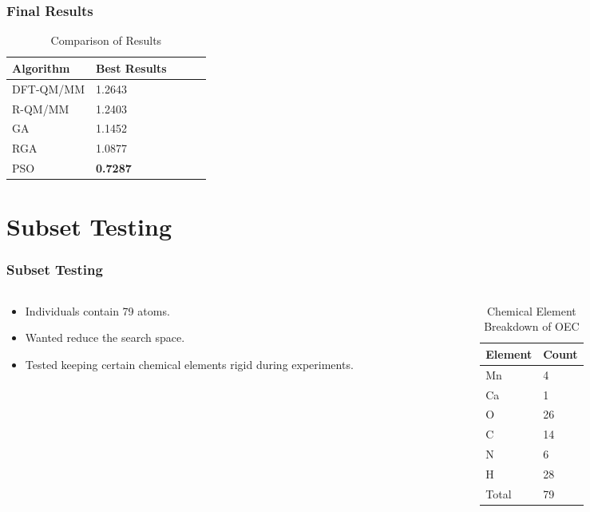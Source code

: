 \documentclass[10pt]{beamer}
\begin{document}
\begin{frame}
	\frametitle{Final Results}

	\begin{table}
		\caption{Comparison of Results}
		\begin{tabular}{ | l | l | l | l | l | }
		  \hline
		    Algorithm & Best Results \\ \hline
		    DFT-QM/MM & 1.2643 \\ \hline
		    R-QM/MM & 1.2403 \\ \hline
		    GA & 1.1452 \\ \hline
		    RGA & 1.0877 \\ \hline
		    PSO & \textbf{0.7287} \\ \hline
		\end{tabular}
	\end{table}

\end{frame}

\section{Subset Testing}

\begin{frame}
	\frametitle{Subset Testing}

	\begin{columns}[T]
		\begin{column}{.5\textwidth}
			\begin{itemize}
				\item Individuals contain 79 atoms.
				\item Wanted reduce the search space.
				\item Tested keeping certain chemical elements rigid during experiments.
			\end{itemize}
		\end{column}
		\begin{column}{.5\textwidth}
			\begin{table}
				\caption{Chemical Element Breakdown of OEC}
				\begin{tabular}{ | l | l | }
				  \hline
				    Element & Count \\ \hline
				    Mn & 4 \\ \hline
				    Ca & 1 \\ \hline
				    O & 26 \\ \hline
				    C & 14 \\ \hline
				    N & 6 \\ \hline
				    H & 28 \\ \hline
				    Total & 79 \\ \hline
				\end{tabular}
			\end{table}
		\end{column}
	\end{columns}

\end{frame}
\end{document}

